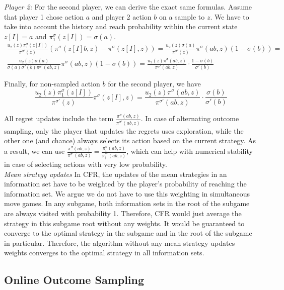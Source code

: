 \documentclass[preprint,12pt]{elsarticle}
\begin{document}
\noindent
\emph{Player 2:} For the second player, we can derive the exact same formulas. Assume that player 1 chose action $a$ and player 2 action $b$ on a sample to $z$. We have to take into account the history and reach probability within the current state $z[I]=a$ and $\pi^{\sigma}_{1}(z[I])=\sigma(a)$.
\begin{multline}
\frac{u_2(z)\pi^{\sigma}_{1}(z[I])}{\pi^{\sigma'}(z)}(\pi^{\sigma}(z[I]b,z)-\pi^{\sigma}(z[I],z))=
\frac{u_2(z)\sigma(a)}{\pi^{\sigma'}(z)}\pi^{\sigma}(ab,z)(1-\sigma(b))=\\
\frac{u_2(z)\sigma(a)}{\sigma(a)\sigma'(b)\pi^{\sigma'}(ab,z)}\pi^{\sigma}
(ab,z)(1-\sigma(b))=
\frac{u_2(z)\pi^{\sigma}(ab,z)}{\pi^{\sigma'}(ab,z)}\cdot\frac{1-\sigma(b)}{\sigma'(b)}
\end{multline}

Finally, for non-sampled action $b$ for the second player, we have
\begin{equation}
\frac{u_2(z)\pi^{\sigma}_{1}(z[I])}{\pi^{\sigma'}(z)} \pi^{\sigma}(z[I],z)=
\frac{u_2(z)\pi^{\sigma}(ab,z)}{\pi^{\sigma'}(ab,z)} \cdot\frac{\sigma(b)}{\sigma'(b)}
\end{equation}

All regret updates include the term $\frac{\pi^{\sigma}(ab,z)}{\pi^{\sigma'}(ab,z)}$. In case of alternating outcome sampling, only the player that updates the regrets uses exploration, while the other one (and chance) always selects its action based on the current strategy. As a result, we can use $\frac{\pi^{\sigma}(ab,z)}{\pi^{\sigma'}(ab,z)} = \frac{\pi_i^{\sigma}(ab,z)}{\pi_i^{\sigma'}(ab,z)}$, which can help with numerical stability in case of selecting actions with very low probability.\\


\noindent
\emph{Mean strategy updates}
In CFR, the updates of the mean strategies in an information set have to be weighted by the player's probability of reaching the information set. We argue we do not have to use this weighting in simultaneous move games. In any subgame, both information sets in the root of the subgame are always visited with probability 1. Therefore, CFR would just average the strategy in this subgame root without any weights. It would be guaranteed to converge to the optimal strategy in the subgame and in the root of the subgame in particular. Therefore, the algorithm without any mean strategy updates weights converges to the optimal strategy in all information sets.

\subsection{Online Outcome Sampling} \label{sec:oos}
\end{document}
